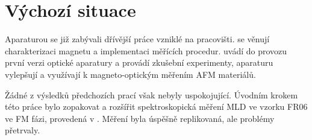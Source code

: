 \section{Výchozí situace}
\label{chap:vychozi-situace}

Aparaturou se již zabývali dřívější práce vzniklé na pracovišti.
\cite{kimakCharakterizaciaDvojdimenzionalnehoElektromagnetu2017,kimakOptickaSpektroskopieAntiferomagnetu2019} se věnují charakterizaci magnetu a implementaci měřících procedur.
\cite{wohlrathMagnetooptickaCharakterizaceSpintronickych2018} uvádí do provozu první verzi optické aparatury a provádí zkušební experimenty, \cite{kubascikMagnetooptickeStudiumAntiferomagnetickych2019,kimakOptickaSpektroskopieAntiferomagnetu2019} aparaturu vylepšují a využívají k magneto-optickým měřením AFM materiálů.

Žádné z výsledků předchozích prací však nebyly uspokojující.
Úvodním krokem této práce bylo zopakovat a rozšířit spektroskopická měření MLD ve vzorku FR06 ve FM fázi, provedená v \cite{kubascikMagnetooptickeStudiumAntiferomagnetickych2019}.
Měření byla úspěšně replikovaná, ale problémy přetrvaly.
